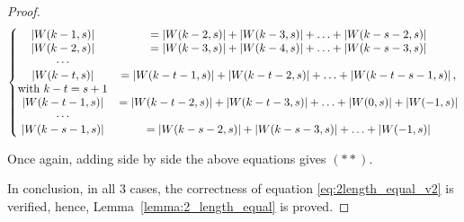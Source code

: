 \begin{proof}
    \[\left\{\begin{matrix}
        \left \lvert  W(k-1,s) \right \rvert &= \left \lvert  W(k-2,s) \right \rvert + \left \lvert  W(k-3,s) \right \rvert+\ldots + \left \lvert  W(k-s-2,s) \right \rvert \\
        \left \lvert  W(k-2,s) \right \rvert &= \left \lvert  W(k-3,s) \right \rvert + \left \lvert  W(k-4,s) \right \rvert+\ldots + \left \lvert  W(k-s-3,s) \right \rvert \\
        \cdots \\
        \left \lvert  W(k-t,s) \right \rvert &= \left \lvert  W(k-t-1,s) \right \rvert + \left \lvert  W(k-t-2,s) \right \rvert+\ldots + \left \lvert  W(k-t-s-1,s) \right \rvert,\\ \text{with } k-t=s+1  \\
        \left \lvert  W(k-t-1,s) \right \rvert &= \left \lvert  W(k-t-2,s) \right \rvert + \left \lvert  W(k-t-3,s) \right \rvert+\ldots + \left \lvert  W(0,s) \right \rvert +\left \lvert  W(-1,s) \right \rvert\\
        \cdots\\
        \left \lvert  W(k-s-1,s) \right \rvert &= \left \lvert  W(k-s-2,s) \right \rvert + \left \lvert  W(k-s-3,s) \right \rvert +\ldots+ \left \lvert  W(-1,s) \right \rvert \\
    \end{matrix}\right.\]

    Once again, adding side by side the above equations gives $(**)$.
    
    In conclusion, in all $3$ cases, the correctness of equation \ref{eq:2length_equal_v2} is verified, hence, Lemma~\ref{lemma:2_length_equal} is proved.
\end{proof}
